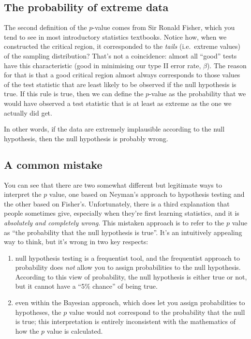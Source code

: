 \documentclass[
]{book}
\providecommand{\tightlist}{%
  \setlength{\itemsep}{0pt}\setlength{\parskip}{0pt}}
\theoremstyle{definition}
\theoremstyle{definition}
\theoremstyle{definition}
\theoremstyle{definition}
\theoremstyle{remark}
\begin{document}
\hypertarget{the-probability-of-extreme-data}{%
\subsection{The probability of extreme data}\label{the-probability-of-extreme-data}}

The second definition of the \(p\)-value comes from Sir Ronald Fisher, which you tend to see in most introductory statistics textbooks. Notice how, when we constructed the critical region, it corresponded to the \emph{tails} (i.e.~extreme values) of the sampling distribution? That's not a coincidence: almost all ``good'' tests have this characteristic (good in minimising our type II error rate, \(\beta\)). The reason for that is that a good critical region almost always corresponds to those values of the test statistic that are least likely to be observed if the null hypothesis is true. If this rule is true, then we can define the \(p\)-value as the probability that we would have observed a test statistic that is at least as extreme as the one we actually did get.

In other words, if the data are extremely implausible according to the null hypothesis, then the null hypothesis is probably wrong.

\hypertarget{a-common-mistake}{%
\subsection{A common mistake}\label{a-common-mistake}}

You can see that there are two somewhat different but legitimate ways to interpret the \(p\) value, one based on Neyman's approach to hypothesis testing and the other based on Fisher's. Unfortunately, there is a third explanation that people sometimes give, especially when they're first learning statistics, and it is \emph{absolutely and completely wrong}. This mistaken approach is to refer to the \(p\) value as ``the probability that the null hypothesis is true''. It's an intuitively appealing way to think, but it's wrong in two key respects:

\begin{enumerate}
\def\labelenumi{(\arabic{enumi})}
\tightlist
\item
  null hypothesis testing is a frequentist tool, and the frequentist approach to probability does \emph{not} allow you to assign probabilities to the null hypothesis. According to this view of probability, the null hypothesis is either true or not, but it cannot have a ``5\% chance'' of being true.
\item
  even within the Bayesian approach, which does let you assign probabilities to hypotheses, the \(p\) value would not correspond to the probability that the null is true; this interpretation is entirely inconsistent with the mathematics of how the \(p\) value is calculated.
\end{enumerate}
\end{document}
